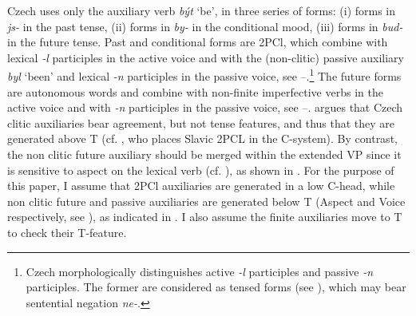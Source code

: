 \documentclass[output=paper,colorlinks,citecolor=brown,
modfonts
]{langscibook}
\begin{document}
Czech uses only the auxiliary verb \textit{být} `be', in three series of forms: (i) forms in \textit{js-} in the past tense, (ii) forms in \textit{by-} in the conditional mood, (iii) forms in \textit{bud-} in the future tense. Past and conditional forms are 2PCl, which combine with lexical \textit{-l} participles in the active voice and with the (non-clitic) passive auxiliary \textit{byl} `been' and lexical \textit{-n} participles in the passive voice, see --.\footnote{Czech morphologically distinguishes active \textit{-l} participles and passive \textit{-n} participles. The former are considered as tensed forms (see \citealt{Veselovská1995,Veselovská2008}), which may bear sentential negation \textit{ne-}.} The future forms are autonomous words and combine with non-finite imperfective verbs in the active voice and with \textit{-n} participles in the passive voice, see --. \cite{Veselovská1995,Veselovská2008} argues that Czech clitic auxiliaries bear agreement, but not tense features, and thus that they are generated above T (cf. \citealt{Roberts2010}, who places Slavic 2PCL in the C-system). By contrast, the non clitic future auxiliary should be merged within the extended VP since it is sensitive to aspect on the lexical verb (cf. \citealt{Kyncl2008}), as shown in . For the purpose of this paper, I assume that 2PCl auxiliaries are generated in a low C-head, while non clitic future and passive auxiliaries are generated below T (Aspect and Voice respectively, see \citealt{Cinque2004}), as indicated in . I also assume the finite auxiliaries move to T to check their T-feature.  
\end{document}
